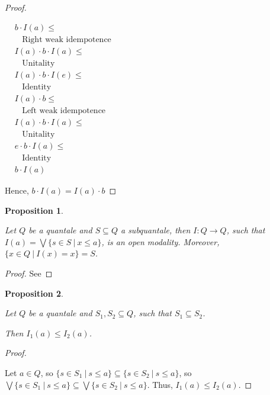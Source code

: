 \documentclass[a4paper]{article}
\newtheorem{prop}{Proposition}
\begin{document}
\begin{proof}
$ $

  $\begin{array}{lll}
  & b \cdot I(a) \leq & \\
  & \:\:\:\: \text{Right weak idempotence}& \\
  &I(a) \cdot b \cdot I(a) \leq & \\
  & \:\:\:\: \text{Unitality}& \\
  & I(a) \cdot b \cdot I(e) \leq & \\
  & \:\:\:\: \text{Identity}& \\
  &I(a) \cdot b \leq & \\
  & \:\:\:\: \text{Left weak idempotence}& \\
  &I(a) \cdot b \cdot I(a) \leq & \\
  & \:\:\:\: \text{Unitality}& \\
  &e \cdot b \cdot I(a) \leq & \\
  & \:\:\:\: \text{Identity}& \\
  &b \cdot I(a)&
  \end{array}$

Hence, $b \cdot I(a) = I(a) \cdot b$

\end{proof}

\begin{prop}
$ $

  Let $Q$ be a quantale and $S \subseteq Q$ a subquantale, then $I : Q \to Q$, such that
$I(a) = \bigvee \{ s \in S \: | \: x \leq a \}$, is an open modality. Moreover, $\{ x \in Q \: | \: I(x) = x\} = S$.
\end{prop}

\begin{proof}
  See
\end{proof}

\begin{prop}
$ $

  Let $Q$ be a quantale and $S_1, S_2 \subseteq Q$, such that $S_1 \subseteq S_2$.

  Then $I_1 (a) \leq I_2 (a)$.
\end{prop}

\begin{proof}
$ $

  Let $a \in Q$, so $\{ s \in S_1 \: | \: s \leq a \} \subseteq \{ s \in S_2 \: | \: s \leq a \}$, so
  $\bigvee \{ s \in S_1 \: | \: s \leq a \} \subseteq \bigvee \{ s \in S_2 \: | \: s \leq a \}$.
  Thus, $I_1 (a) \leq I_2 (a)$.
\end{proof}
\end{document}
